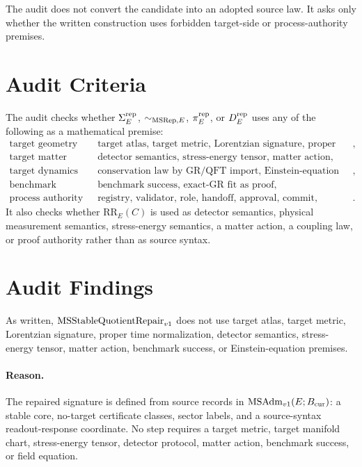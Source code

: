 The audit does not convert the candidate into an adopted source law. It asks
only whether the written construction uses forbidden target-side or
process-authority premises.

\section{Audit Criteria}

The audit checks whether \(\Sigma^{\mathrm{rep}}_E\), \(\sim_{\mathrm{MSRep},E}\), \(\pi^{\mathrm{rep}}_E\), or
\(D^{\mathrm{rep}}_E\) uses any of the following as a mathematical premise:
\[
\begin{array}{ll}
\text{target geometry} & \text{target atlas, target metric, Lorentzian signature, proper time},\\
\text{target matter} & \text{detector semantics, stress-energy tensor, matter action},\\
\text{target dynamics} & \text{conservation law by GR/QFT import, Einstein-equation premise},\\
\text{benchmark authority} & \text{benchmark success, exact-GR fit as proof},\\
\text{process authority} & \text{registry, validator, role, handoff, approval, commit, generated derivative}.
\end{array}
\]
It also checks whether \(\mathrm{RR}_E(C)\) is used as detector semantics,
physical measurement semantics, stress-energy semantics, a matter action, a
coupling law, or proof authority rather than as source syntax.

\section{Audit Findings}

\begin{proposition}
As written, \(\mathrm{MSStableQuotientRepair}_{v1}\) does not use target atlas, target metric,
Lorentzian signature, proper time normalization, detector semantics,
stress-energy tensor, matter action, benchmark success, or Einstein-equation
premises.
\end{proposition}

\paragraph{Reason.}
The repaired signature is defined from source records in
\(\mathrm{MSAdm}_{v1}(E;B_{\mathrm{cur}})\): a stable core, no-target certificate classes, sector
labels, and a source-syntax readout-response coordinate. No step requires a
target metric, target manifold chart, stress-energy tensor, detector protocol,
matter action, benchmark success, or field equation.


